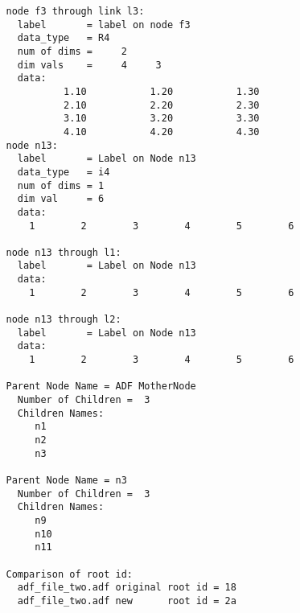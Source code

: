 \begin{verbatim}
   node f3 through link l3:
     label       = label on node f3
     data_type   = R4
     num of dims =     2
     dim vals    =     4     3
     data:
             1.10           1.20           1.30
             2.10           2.20           2.30
             3.10           3.20           3.30
             4.10           4.20           4.30
   node n13:
     label       = Label on Node n13
     data_type   = i4
     num of dims = 1
     dim val     = 6
     data:
       1        2        3        4        5        6

   node n13 through l1:
     label       = Label on Node n13
     data:
       1        2        3        4        5        6

   node n13 through l2:
     label       = Label on Node n13
     data:
       1        2        3        4        5        6

   Parent Node Name = ADF MotherNode
     Number of Children =  3
     Children Names:
        n1
        n2
        n3

   Parent Node Name = n3
     Number of Children =  3
     Children Names:
        n9
        n10
        n11

   Comparison of root id:
     adf_file_two.adf original root id = 18
     adf_file_two.adf new      root id = 2a
\end{verbatim}
